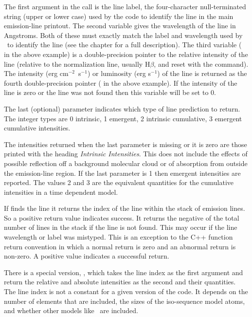 The first argument in the call is the line label, the four-character
null-terminated string (upper or lower case) used by the code to identify
the line in the main emission-line printout.  The second variable gives
the wavelength of the line in Angstroms.  Both of these must exactly match
the label and wavelength used by \Cloudy\ to identify the line
(see the chapter  for a full description).
The third variable ( in the above
example) is a double-precision pointer to the relative intensity of the
line (relative to the normalization line, usually H$\beta$,
and reset with the
 command).
The intensity (erg cm$^{-2}$~s$^{-1}$) or luminosity (erg s$^{-1}$)
of the line is returned as the fourth double-precision pointer
( in the above example).
If the intensity of the line is zero or
the line was not found then this variable will be set to 0.

The last (optional) parameter indicates which type of line prediction to return.
The integer types are
 0 intrinsic, 
 1 emergent, 
 2 intrinsic cumulative, 
 3 emergent cumulative
 intensities.

The intensities returned when the last parameter is missing
or it is zero are those printed with the
heading \emph{Intrinsic Intensities}.
This does not include the effects of possible
reflection off a background molecular cloud or of absorption from outside
the emission-line region.
If the last parameter is 1 then emergent
intensities are reported.
The values 2 and 3 are the equivalent quantities for the cumulative
intensities in a time dependent model.

If  finds the line it returns the index of the line within the
stack of emission lines.
So a positive return value indicates success.
It returns the negative of the total number of lines in the stack if the
line is not found.  This may occur if the line wavelength or label was
mistyped.  This is an exception to the C++ function return convention in
which a normal return is zero and an abnormal return is non-zero.  A positive
value indicates a successful return.

There is a special version, ,  which takes the line index as
the first argument and return the relative and absolute intensities as the
second and their quantities.  The line index is not a constant for a given
version of the code.  It depends on the number of elements that are included,
the sizes of the iso-sequence model atoms, and whether other models like
\htwo\ are included.

